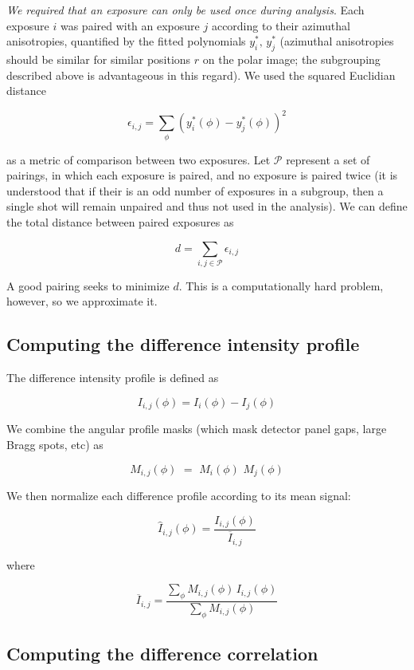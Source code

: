 \documentclass [12pt,fleqn]{article}
\def \be {\begin{equation}}
\def \ee {\end{equation}}
\begin{document}
\emph{We required that an exposure can only be used once during analysis}. Each  exposure $i$ was paired with an exposure $j$ according to their azimuthal anisotropies, quantified by the fitted polynomials $y^*_i,\, y^*_j$  (azimuthal anisotropies should be similar for similar positions $r$ on the polar image; the subgrouping described above is advantageous in this regard). We used the squared Euclidian distance

\be
\epsilon_{i,j} = \sum\limits_\phi  \left ( y^*_i (\phi) -  y^*_j (\phi) \right ) ^2
\ee

as a metric of comparison between two exposures. Let $\mathcal P$ represent a set of pairings, in which each exposure is paired, and no exposure is paired twice (it is understood that if their is an odd number of exposures in a subgroup, then a single shot will remain unpaired and thus not used in the analysis). We can define the total distance between paired exposures as

\be
d = \sum_{i,j \in \mathcal P} \epsilon_{i,j}
\ee

A good pairing seeks to minimize $d$. This is a computationally hard problem, however, so we approximate it.

\subsection{Computing the difference intensity profile}
The difference intensity profile is defined as

\begin{equation}
I_{i,j}(\phi) = I_i(\phi) -I_{j}(\phi) 
\end{equation}

We combine the angular profile masks (which mask detector panel gaps, large Bragg spots, etc) as

\begin{equation}
M_{i,j}(\phi) \,\,= \,\,M_i(\phi)\,\,M_j(\phi)
\end{equation}

We then normalize each difference profile according to its mean signal:

\be
\widehat I_{i,j}(\phi) = \frac{I_{i,j}(\phi)} { \overline I_{i,j}}
\ee

where

\be
\overline I_{i,j} = \frac{ \sum_\phi M_{i,j}(\phi) \, I_{i,j}(\phi)  } {\sum_\phi M_{i,j}(\phi)}
\ee

\subsection{Computing the difference correlation}
\end{document}
